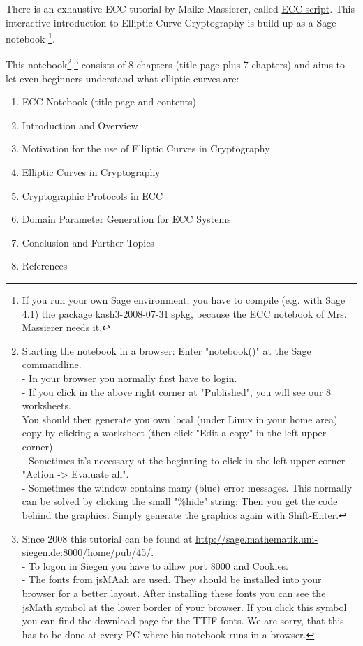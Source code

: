 There is an exhaustive ECC tutorial by Maike Massierer,
called \hyperlink{ec:Web-Link:Sage_Massierer}{ECC script}.
This interactive introduction to Elliptic Curve Cryptography is build up as
a Sage notebook%
\footnote{%
If you run your own Sage environment, you have to compile (e.g. with Sage 4.1)
the package kash3-2008-07-31.spkg, because the ECC notebook of Mrs. Massierer
needs it.
}.

This notebook\footnote{%
Starting the notebook in a browser: Enter "notebook()" at the Sage commandline.\\
- In your browser you normally first have to login.\\
- If you click in the above right corner at "Published", you will see our 8 worksheets.\\
You should then generate you own local (under Linux in your home area) copy by clicking
a worksheet (then click "Edit a copy" in the left upper corner).\\
- Sometimes it's necessary at the beginning to click in the left upper corner
"Action -> Evaluate all".\\
- Sometimes the window contains many (blue) error messages. This normally can be
solved by clicking the small "\%hide" string: Then you get the code behind the
graphics. Simply generate the graphics again with Shift-Enter.
},\footnote{%
  Since 2008 this tutorial can be found at
    \url{http://sage.mathematik.uni-siegen.de:8000/home/pub/45/}.\\
  - To logon in Siegen you have to allow port 8000 and Cookies.\\
  - The fonts from jsMAah are used. They should be installed into your browser for a better layout.
    After installing these fonts you can see the jsMath symbol at the lower border
    of your browser. If you click this symbol you can find the download page for the TTIF fonts.
    We are sorry, that this has to be done at every PC where his notebook runs in a browser.
}
consists of 8 chapters (title page plus 7 chapters)
and aims to let even beginners understand what elliptic curves are:

\begin{enumerate}
   \setcounter{enumii}{0}

   \item ECC Notebook (title page and contents)
   \item Introduction and Overview
   \item Motivation for the use of Elliptic Curves in Cryptography
   \item Elliptic Curves in Cryptography
   \item Cryptographic Protocols in ECC
   \item Domain Parameter Generation for ECC Systems
   \item Conclusion and Further Topics
   \item References

\end{enumerate}



